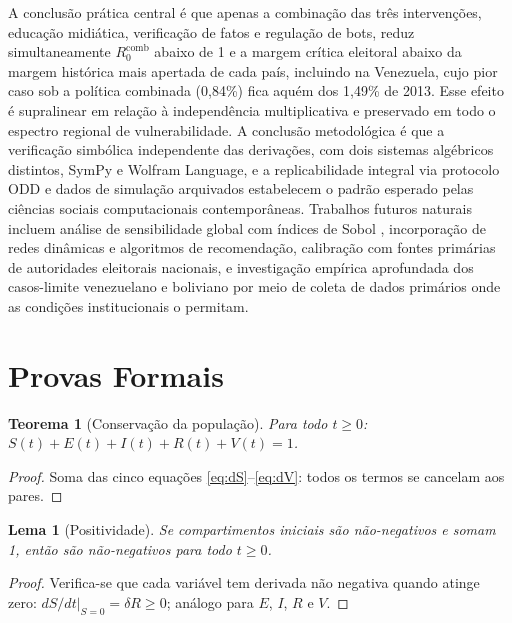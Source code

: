 \documentclass[12pt,a4paper]{article}
\theoremstyle{definition}
\theoremstyle{plain}
\newtheorem{lema}{Lema}
\newtheorem{teorema}{Teorema}
\begin{document}
A conclusão prática central é que apenas a combinação das três intervenções, educação midiática, verificação de fatos e regulação de bots, reduz simultaneamente $R_0^{\text{comb}}$ abaixo de 1 e a margem crítica eleitoral abaixo da margem histórica mais apertada de cada país, incluindo na Venezuela, cujo pior caso sob a política combinada (0,84\%) fica aquém dos 1,49\% de 2013. Esse efeito é supralinear em relação à independência multiplicativa e preservado em todo o espectro regional de vulnerabilidade. A conclusão metodológica é que a verificação simbólica independente das derivações, com dois sistemas algébricos distintos, SymPy e Wolfram Language, e a replicabilidade integral via protocolo ODD \citep{grimm2010odd} e dados de simulação arquivados estabelecem o padrão esperado pelas ciências sociais computacionais contemporâneas. Trabalhos futuros naturais incluem análise de sensibilidade global com índices de Sobol \citep{saltelli2008global}, incorporação de redes dinâmicas e algoritmos de recomendação, calibração com fontes primárias de autoridades eleitorais nacionais, e investigação empírica aprofundada dos casos-limite venezuelano e boliviano por meio de coleta de dados primários onde as condições institucionais o permitam.




\appendix

\section{Provas Formais}
\label{app:proofs}

\begin{teorema}[Conservação da população]
\label{thm:conservation}
Para todo $t \geq 0$: $S(t) + E(t) + I(t) + R(t) + V(t) = 1$.
\end{teorema}
\begin{proof}
Soma das cinco equações \eqref{eq:dS}--\eqref{eq:dV}: todos os termos se cancelam aos pares.
\end{proof}

\begin{lema}[Positividade]
Se compartimentos iniciais são não-negativos e somam 1, então são não-negativos para todo $t \geq 0$.
\end{lema}
\begin{proof}
Verifica-se que cada variável tem derivada não negativa quando atinge zero: $dS/dt|_{S=0} = \delta R \geq 0$; análogo para $E$, $I$, $R$ e $V$.
\end{proof}
\end{document}
